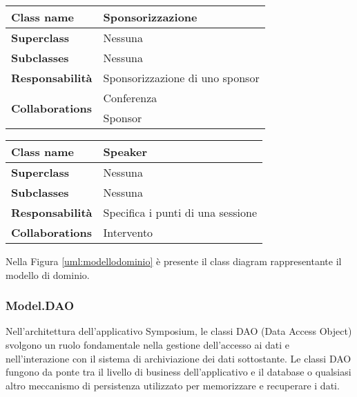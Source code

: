 \begin{table}[h!]
\begin{tabular}{|l|l|}
	\hline
	\textbf{Class name} & Sponsorizzazione \\ \hline
	\textbf{Superclass} & Nessuna \\ \hline
	\textbf{Subclasses} & Nessuna  \\ \hline
	\textbf{Responsabilità} & Sponsorizzazione di uno sponsor \\ \hline
	\multirow{2}{*}{\textbf{Collaborations}} & Conferenza \\ 
	& Sponsor \\ \hline
\end{tabular}
\end{table}

\begin{table}[h!]
\begin{tabular}{|l|l|}
	\hline
	\textbf{Class name} & Speaker \\ \hline
	\textbf{Superclass} & Nessuna \\ \hline
	\textbf{Subclasses} & Nessuna  \\ \hline
	\textbf{Responsabilità} & Specifica i punti di una sessione \\ \hline
	\multirow{1}{*}{\textbf{Collaborations}} & Intervento \\ \hline
\end{tabular}
\end{table}

Nella Figura \ref{uml:modellodominio} è presente il class diagram rappresentante il modello di dominio. 
\subsubsection{Model.DAO}
Nell'architettura dell'applicativo Symposium, le classi DAO (Data Access Object) svolgono un ruolo fondamentale nella gestione dell'accesso ai dati e nell'interazione con il sistema di archiviazione dei dati sottostante. Le classi DAO fungono da ponte tra il livello di business dell'applicativo e il database o qualsiasi altro meccanismo di persistenza utilizzato per memorizzare e recuperare i dati.
\bigskip

